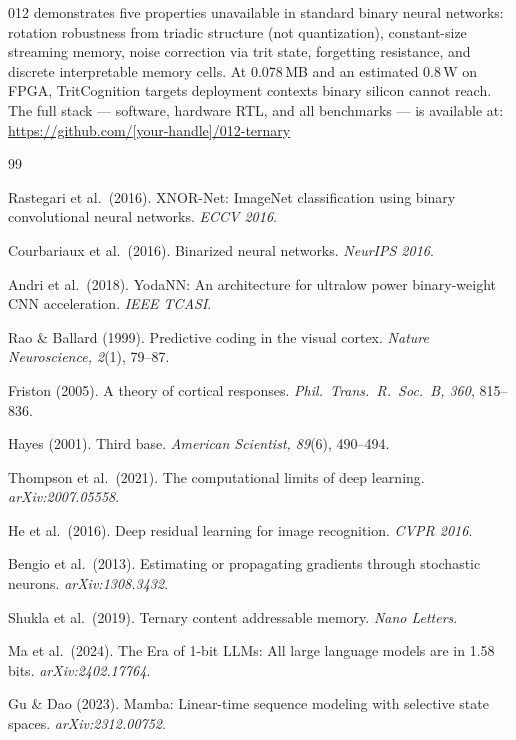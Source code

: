 \documentclass[10pt,twocolumn]{article}
\newcommand{\tritnet}{TritCognition}
\begin{document}
012 demonstrates five properties unavailable in standard binary neural
networks: rotation robustness from triadic structure (not quantization),
constant-size streaming memory, noise correction via trit state,
forgetting resistance, and discrete interpretable memory cells.
At 0.078\,MB and an estimated 0.8\,W on FPGA, \tritnet{} targets deployment
contexts binary silicon cannot reach. The full stack --- software,
hardware RTL, and all benchmarks --- is available at:
\url{https://github.com/[your-handle]/012-ternary}


\begin{thebibliography}{99}

Rastegari et al.\ (2016). XNOR-Net: ImageNet classification using binary
convolutional neural networks. \textit{ECCV 2016}.

Courbariaux et al.\ (2016). Binarized neural networks.
\textit{NeurIPS 2016}.

Andri et al.\ (2018). YodaNN: An architecture for ultralow power
binary-weight CNN acceleration. \textit{IEEE TCASI}.

Rao \& Ballard (1999). Predictive coding in the visual cortex.
\textit{Nature Neuroscience, 2}(1), 79--87.

Friston (2005). A theory of cortical responses.
\textit{Phil.\ Trans.\ R.\ Soc.\ B, 360}, 815--836.

Hayes (2001). Third base. \textit{American Scientist, 89}(6), 490--494.

Thompson et al.\ (2021). The computational limits of deep learning.
\textit{arXiv:2007.05558}.

He et al.\ (2016). Deep residual learning for image recognition.
\textit{CVPR 2016}.

Bengio et al.\ (2013). Estimating or propagating gradients through
stochastic neurons. \textit{arXiv:1308.3432}.

Shukla et al.\ (2019). Ternary content addressable memory.
\textit{Nano Letters}.

Ma et al.\ (2024). The Era of 1-bit LLMs: All large language models
are in 1.58 bits. \textit{arXiv:2402.17764}.

Gu \& Dao (2023). Mamba: Linear-time sequence modeling with
selective state spaces. \textit{arXiv:2312.00752}.

\end{thebibliography}
\end{document}
